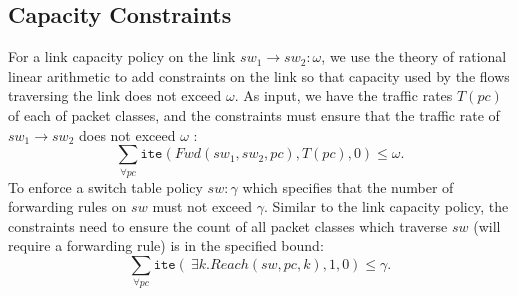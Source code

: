

\subsection{Capacity Constraints} \label{sec:linkcap}
For a link capacity policy on the link $sw_1 \rightarrow sw_2: \omega$, we use the theory of rational linear arithmetic to add constraints on the link so that capacity used by the flows traversing the link does not exceed $\omega$. As input, we have the traffic rates $T(pc)$ of
each of packet classes, and the constraints must ensure that the traffic rate of $sw_1 \rightarrow sw_2$
does not exceed $\omega$ :
\begin{equation}
 \sum_{\forall pc} \texttt{ite}(Fwd(sw_1,sw_2, pc), T(pc), 0) \leq \omega .
\end{equation}
To enforce a switch table policy $sw : \gamma$ which specifies that the number of forwarding 
rules on $sw$ must not exceed $\gamma$. Similar to the link capacity policy,
the constraints need to ensure the count of all packet classes which traverse $sw$ (will require 
a forwarding rule) is in the specified bound:
\begin{equation}
\sum_{\forall pc} \texttt{ite}(~\exists k. Reach(sw,pc,k), 1, 0)  \leq \gamma.
\end{equation}

